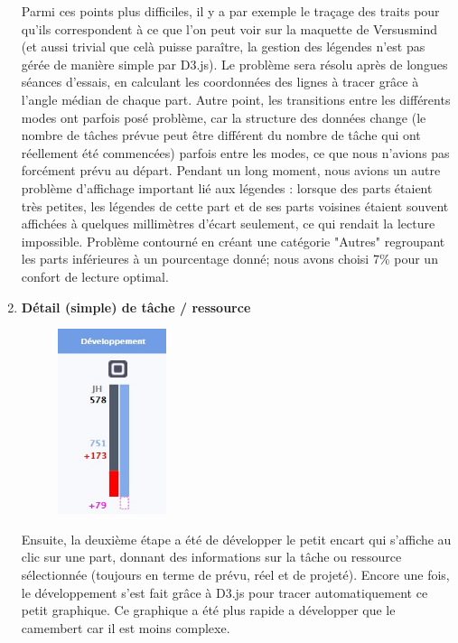 \documentclass[12pt]{report}
\begin{document}
\begin{enumerate}
Parmi ces points plus difficiles, il y a par exemple le traçage des traits pour qu'ils correspondent à ce que l'on peut voir sur la maquette de Versusmind (et aussi trivial que celà puisse paraître, la gestion des légendes n'est pas gérée de manière simple par D3.js). Le problème sera résolu après de longues séances d'essais, en calculant les coordonnées des lignes à tracer grâce à l'angle médian de chaque part. 
Autre point, les transitions entre les différents modes ont parfois posé problème, car la structure des données change (le nombre de tâches prévue peut être différent du nombre de tâche qui ont réellement été commencées) parfois entre les modes, ce que nous n'avions pas forcément prévu au départ.
Pendant un long moment, nous avions un autre problème d'affichage important lié aux légendes : lorsque des parts étaient très petites, les légendes de cette part et de ses parts voisines étaient souvent affichées à quelques millimètres d'écart seulement, ce qui rendait la lecture impossible. Problème contourné en créant une catégorie "Autres" regroupant les parts inférieures à un pourcentage donné; nous avons choisi 7\% pour un confort de lecture optimal.\\


\item \textbf{Détail (simple) de tâche / ressource}\\

\begin{figure}[H]
	\centering
	\includegraphics[width=0.3\textwidth]{pictures/realisations/detailTache.jpg}
	\caption{}
	\label{19}
\end{figure}

Ensuite, la deuxième étape a été de développer le petit encart qui s'affiche au clic sur une part, donnant des informations sur la tâche ou ressource sélectionnée (toujours en terme de prévu, réel et de projeté). Encore une fois, le développement s'est fait grâce à D3.js pour tracer automatiquement ce petit graphique. Ce graphique a été plus rapide a développer que le camembert car il est moins complexe.\\


\end{enumerate}
\end{document}
